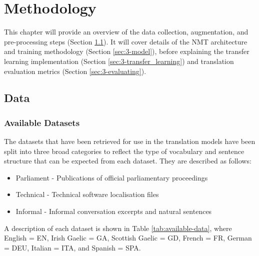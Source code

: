 \chapter{Methodology}
This chapter will provide an overview of the data collection, augmentation, and pre-processing steps (Section \ref{sec:3-data}). It will cover details of the \acrshort{NMT} architecture and training methodology (Section \ref{sec:3-model}), before explaining the transfer learning implementation (Section \ref{sec:3-transfer_learning}) and translation evaluation metrics (Section \ref{sec:3-evaluating}).
\newpage

\section{Data}
\label{sec:3-data}
\subsection{Available Datasets}

The datasets that have been retrieved for use in the translation models have been split into three broad categories to reflect the type of vocabulary and sentence structure that can be expected from each dataset. They are described as follows:

\begin{itemize}
    \item Parliament - Publications of official parliamentary proceedings
    \item Technical - Technical software localisation files
    \item Informal - Informal conversation excerpts and natural sentences
\end{itemize}

A description of each dataset is shown in Table \ref{tab:available-data}, where English = EN, Irish Gaelic = GA, Scottish Gaelic = GD, French = FR, German = DEU, Italian = ITA, and Spanish = SPA.

